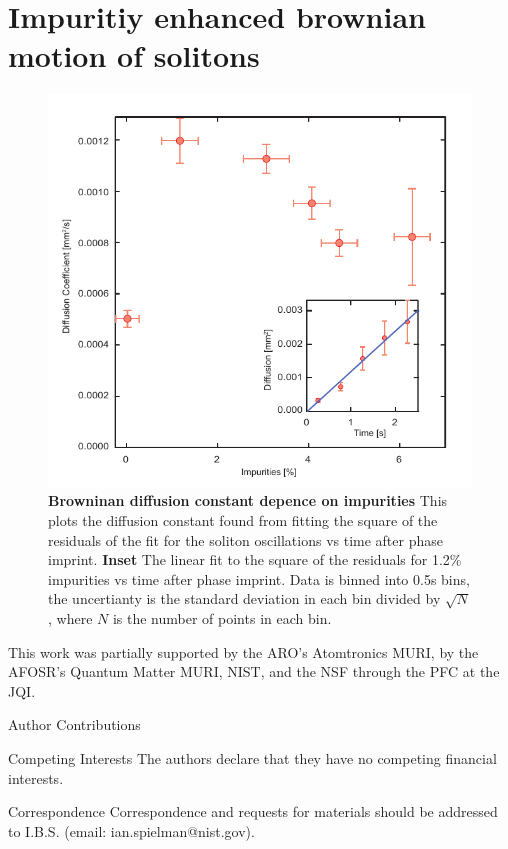 \documentclass{nature}
\begin{document}
\section{Impuritiy enhanced brownian motion of solitons}
\begin{figure}[h!]
   \includegraphics[width=136mm]{Figures/Fig4_Diff.pdf}
   \caption{\textbf{Browninan diffusion constant depence on impurities} This plots the diffusion constant found from fitting the square of the residuals of the fit for the soliton oscillations vs time after phase imprint. \textbf{Inset} The linear fit to the square of the residuals for 1.2\% impurities vs time after phase imprint. Data is binned into 0.5s bins, the uncertianty is the standard deviation in each bin divided by $\sqrt{N}$, where $N$ is the number of points in each bin.}
   \label{solDiff}
\end{figure}



\begin{addendum}
\item This work was partially supported by the ARO's Atomtronics MURI, by the AFOSR's Quantum Matter MURI, NIST, and the NSF through the PFC at the JQI.

\item[Author Contributions] 

\item[Competing Interests]  The authors declare that they have no competing financial interests.

\item[Correspondence] Correspondence and requests for materials should be addressed to I.B.S. (email: ian.spielman@nist.gov).

\end{addendum}
\end{document}
